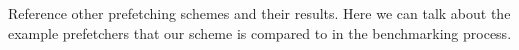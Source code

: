 Reference other prefetching schemes and their results. Here we can talk about the example prefetchers that our scheme is compared to in the benchmarking process.
